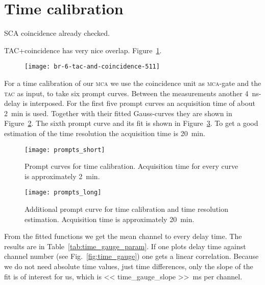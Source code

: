 \documentclass[11pt, english, fleqn, DIV=15, headinclude, BCOR=2cm]{scrreprt}
\begin{document}
\section{Time calibration}

SCA coincidence already checked.

TAC+coincidence has very nice overlap.
Figure~\ref{fig:6-tac-and-coincidence-511}.

\begin{figure}
    \centering
    \texttt{[image: br-6-tac-and-coincidence-511]}
    \caption{%
    }
    \label{fig:6-tac-and-coincidence-511}
\end{figure}

For a time calibration of our \textsc{mca} we use the coincidence unit as
\textsc{mca}-gate and the \textsc{tac} as input, to take six prompt curves.
Between the measurements another \SI{4}{\nano\second}-delay is interposed. For
the first five prompt curves an acquisition time of about \SI{2}{\minute} is
used.  Together with their fitted Gauss-curves they are shown in
Figure~\ref{fig:prompts_short}. The sixth prompt curve and its fit is shown in
Figure~\ref{fig:prompts_long}. To get a good estimation of the time resolution
the acquisition time is \SI{20}{\minute}.

\begin{figure}
\centering
        \texttt{[image: prompts\_short]}
        \caption{%
                Prompt curves for time calibration. Acquisition time for every
                curve is approximately \SI{2}{\minute}.
        }
        \label{fig:prompts_short}
\end{figure}
        
\begin{figure}
\centering
        \texttt{[image: prompts\_long]}
        \caption{%
                Additional prompt curve for time calibration and time
                resolution estimation. Acquisition time is approximately
                \SI{20}{\minute}.
        }
        \label{fig:prompts_long}
\end{figure}

From the fitted functions we get the mean channel to every delay time. The
results are in Table~\ref{tab:time_gauge_param}. If one plots delay time
against channel number (see Fig.~\ref{fig:time_gauge}) one gets a linear
correlation. Because we do not need absolute time values, just time
differences, only the slope of the fit is of interest for us, which is \SI{<<
time_gauge_slope >>}{\milli\second} per channel.
\end{document}
